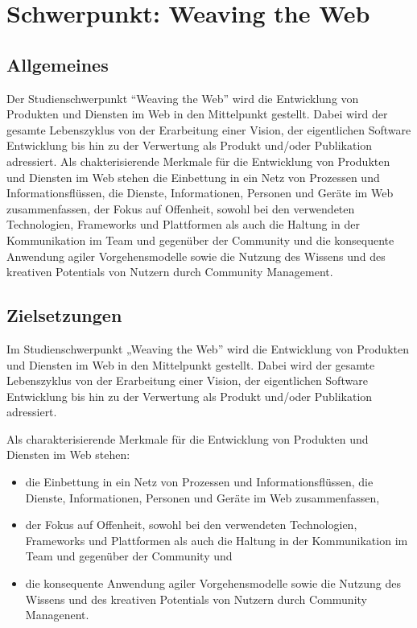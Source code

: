 \chapter{Schwerpunkt: Weaving the
Web\label{/mi-2017/modulbeschreibungen-master/schwerpunkt-weaving-the-web}}\label{schwerpunkt-weaving-the-webpathlabelmi-2017modulbeschreibungen-masterschwerpunkt-weaving-the-web}

\section*{Allgemeines\label{/mi-2017/modulbeschreibungen-master/schwerpunkt-weaving-the-web}}\label{allgemeinespathlabelmi-2017modulbeschreibungen-masterschwerpunkt-weaving-the-web}

Der Studienschwerpunkt ``Weaving the Web'' wird die Entwicklung von
Produkten und Diensten im Web in den Mittelpunkt gestellt. Dabei wird
der gesamte Lebenszyklus von der Erarbeitung einer Vision, der
eigentlichen Software Entwicklung bis hin zu der Verwertung als Produkt
und/oder Publikation adressiert. Als chakterisierende Merkmale für die
Entwicklung von Produkten und Diensten im Web stehen die Einbettung in
ein Netz von Prozessen und Informationsflüssen, die Dienste,
Informationen, Personen und Geräte im Web zusammenfassen, der Fokus auf
Offenheit, sowohl bei den verwendeten Technologien, Frameworks und
Plattformen als auch die Haltung in der Kommunikation im Team und
gegenüber der Community und die konsequente Anwendung agiler
Vorgehensmodelle sowie die Nutzung des Wissens und des kreativen
Potentials von Nutzern durch Community Management.

\section*{Zielsetzungen\label{/mi-2017/modulbeschreibungen-master/schwerpunkt-weaving-the-web}}\label{zielsetzungenpathlabelmi-2017modulbeschreibungen-masterschwerpunkt-weaving-the-web}

Im Studienschwerpunkt „Weaving the Web'' wird die Entwicklung von
Produkten und Diensten im Web in den Mittelpunkt gestellt. Dabei wird
der gesamte Lebenszyklus von der Erarbeitung einer Vision, der
eigentlichen Software Entwicklung bis hin zu der Verwertung als Produkt
und/oder Publikation adressiert.

Als charakterisierende Merkmale für die Entwicklung von Produkten und
Diensten im Web stehen:

\begin{itemize}
\tightlist
\item
  die Einbettung in ein Netz von Prozessen und Informationsflüssen, die
  Dienste, Informationen, Personen und Geräte im Web zusammenfassen,
\item
  der Fokus auf Offenheit, sowohl bei den verwendeten Technologien,
  Frameworks und Plattformen als auch die Haltung in der Kommunikation
  im Team und gegenüber der Community und
\item
  die konsequente Anwendung agiler Vorgehensmodelle sowie die Nutzung
  des Wissens und des kreativen Potentials von Nutzern durch Community
  Managenent.
\end{itemize}

